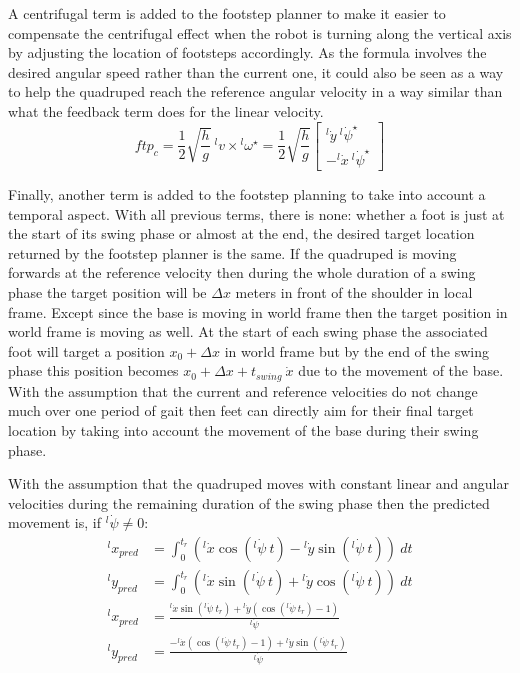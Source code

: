 \documentclass[a4paper,11pt]{article}
\begin{document}
A centrifugal term is added to the footstep planner to make it easier to compensate the centrifugal effect when the robot is turning along the vertical axis by adjusting the location of footsteps accordingly. As the formula involves the desired angular speed rather than the current one, it could also be seen as a way to help the quadruped reach the reference angular velocity in a way similar than what the feedback term does for the linear velocity.
\begin{equation}
{ftp}_{c} = \frac{1}{2} \sqrt{\frac{h}{g}} ~ {}^l\!v \times {}^l\!\omega^\star = \frac{1}{2} \sqrt{\frac{h}{g}} \begin{bmatrix} {}^l\!\dot y ~ {}^l\!\dot \psi^\star \\ - {}^l\!\dot x ~ {}^l\!\dot \psi^\star \end{bmatrix}
\end{equation}

Finally, another term is added to the footstep planning to take into account a temporal aspect. With all previous terms, there is none: whether a foot is just at the start of its swing phase or almost at the end, the desired target location returned by the footstep planner is the same. If the quadruped is moving forwards at the reference velocity then during the whole duration of a swing phase the target position will be $\Delta x$ meters in front of the shoulder in local frame. Except since the base is moving in world frame then the target position in world frame is moving as well. At the start of each swing phase the associated foot will target a position $x_0 + \Delta x$ in world frame but by the end of the swing phase this position becomes $x_0 + \Delta x + t_{swing} ~ \dot x$ due to the movement of the base. With the assumption that the current and reference velocities do not change much over one period of gait then feet can directly aim for their final target location by taking into account the movement of the base during their swing phase.

With the assumption that the quadruped moves with constant linear and angular velocities during the remaining duration of the swing phase then the predicted movement is, if ${}^l\!\dot \psi \neq 0$:
\begin{align}
{}^l\!x_{pred} &= \int_{0}^{t_r} \left( {}^l\!\dot x \cos({}^l\!\dot \psi ~ t) - {}^l\!\dot y \sin({}^l\!\dot \psi ~ t) \right) ~dt \\
{}^l\!y_{pred} &= \int_{0}^{t_r} \left( {}^l\!\dot x \sin({}^l\!\dot \psi ~ t) + {}^l\!\dot y \cos({}^l\!\dot \psi ~ t) \right) ~dt \\
{}^l\!x_{pred} &= \frac{{}^l\!\dot x \sin({}^l\!\dot \psi ~ t_r) + {}^l\!\dot y \left( \cos({}^l\!\dot \psi ~ t_r) - 1 \right)}{{}^l\!\dot \psi} \\
{}^l\!y_{pred} &= \frac{- {}^l\!\dot x \left( \cos({}^l\!\dot \psi ~ t_r) - 1 \right) + {}^l\!\dot y \sin({}^l\!\dot \psi ~ t_r)}{{}^l\!\dot \psi}
\end{align}
\end{document}
